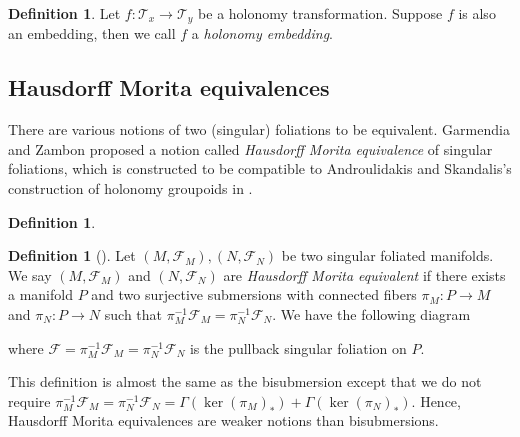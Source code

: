 \documentclass[12pt]{amsart}
\theoremstyle{definition}
\newtheorem{defn}[thm]{Definition}
\theoremstyle{remark}
\numberwithin{equation}{section}
\newcommand{\CF}{{\mathcal F}}
\newcommand{\1}{{\mathbb{1}}}
\begin{document}
\begin{defn}
    Let $f:\mathcal{T}_x \to \mathcal{T}_y$ be a holonomy transformation. Suppose $f$ is also an embedding, then we call $f$ a {\it holonomy embedding}.
\end{defn}


\subsection{Hausdorff Morita equivalences}
There are various notions of two (singular) foliations to be equivalent. Garmendia and Zambon \cite{GZ19} proposed a notion called {\it Hausdorff Morita equivalence} of singular foliations, which is constructed to be compatible to Androulidakis and Skandalis's construction of holonomy groupoids in \cite{AS06}.
\begin{defn}\cite{AS06}

\end{defn}



\begin{defn}[\cite{GZ19}]
    Let $(M, \CF_M), (N, \CF_N)$ be two singular foliated manifolds. We say $(M, \CF_M)$ and $(N, \CF_N)$ are {\it Hausdorff Morita equivalent} if there exists a manifold $P$ and two surjective submersions with connected fibers $\pi_M: P\to M$ and $\pi_N: P\to N$ such that $\pi_M^{-1} \CF_M = \pi_N^{-1} \CF_N$. We have the following diagram
    \begin{center}
    \end{center}
where $\CF = \pi_M^{-1} \CF_M = \pi_N^{-1} \CF_N$ is the pullback singular foliation on $P$.

\end{defn}
This definition is almost the same as the bisubmersion except that we do not require $\pi_M^{-1} \CF_M = \pi_N^{-1} \CF_N=\Gamma(\ker(\pi_M)_*) + \Gamma(\ker(\pi_N)_*)$. Hence, Hausdorff Morita equivalences are weaker notions than bisubmersions. 
\end{document}
